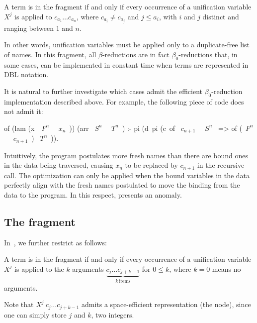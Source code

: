 \documentclass[a4paper, 11pt]{book}
\begin{document}
\begin{definition}
A term is in the \theotherfragment fragment if and only if every occurrence of
a unification variable $X^j$ is applied to $c_{a_1} \ldots c_{a_n}$, where
$c_{a_i} \neq c_{a_j}$ and $j \leq a_i$, with $i$ and $j$
distinct and ranging between $1$ and $n$.
\end{definition}

\noindent
In other words, unification variables must be applied only to a duplicate-free
list of names. In this fragment, all $\beta$-reductions are in fact
$\beta_0$-reductions that, in some cases, can be implemented in constant time
when terms are represented in DBL notation.


It is natural to further investigate which cases admit the efficient
$\beta_0$-reduction implementation described above. For example, the following
piece of code does not admit it:

\begin{elpicode}
of (lam (x\ ~$F^n$~ ~$x_n$~)) (arr ~$S^n$~ ~$T^n$~) :-
  pi (d\ pi (c\ of ~$c_{n+1}$~ ~$S^n$~ => of (~$F^n$~ ~$c_{n+1}$~) ~$T^n$~)).
\end{elpicode}

\noindent
Intuitively, the program postulates more fresh names than there are bound ones
in the data being traversed, causing $x_n$ to be replaced by $c_{n+1}$ in the
recursive call. The optimization can only be applied when the bound variables
in the data perfectly align with the fresh names postulated to move the binding
from the data to the program. In this respect, 
presents an anomaly.

\subsection{The \thefragment fragment}\label{sec:llambo}


In~\cite{dunchev15lpar}, we further restrict \theotherfragment as follows:


\begin{definition}
A term is in the fragment \thefragment if and only if every
occurrence of a unification variable $X^j$ is applied to the $k$ arguments
$\underbrace{c_j \ldots c_{j + k-1}}_{k~\mathrm{items}}$ for $0 \leq k$,
where $k=0$ means no arguments.
\end{definition}


Note that $X^j\ c_j \ldots c_{j + k-1}$ admits a space-efficient
representation (the  node), since one can simply store $j$ and
$k$, two integers.
\end{document}
